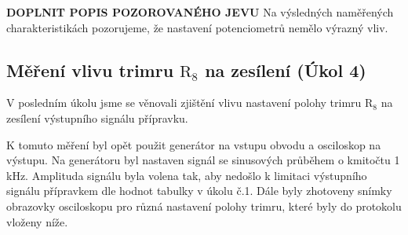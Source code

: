 \documentclass[a4paper, czech]{article}
\begin{document}
\textbf{DOPLNIT POPIS POZOROVANÉHO JEVU}
Na výsledných naměřených charakteristikách pozorujeme, že nastavení potenciometrů nemělo výrazný vliv.

\subsection{Měření vlivu trimru $\text{R}_8$ na zesílení (Úkol 4)}

V posledním úkolu jsme se věnovali zjištění vlivu nastavení polohy trimru $\text{R}_8$ na zesílení
výstupního signálu přípravku.

K tomuto měření byl opět použit generátor na vstupu obvodu a osciloskop na výstupu.
Na generátoru byl nastaven signál se sinusových průběhem o kmitočtu 1\,kHz.
Amplituda signálu byla volena tak, aby nedošlo k limitaci výstupního signálu přípravkem
dle hodnot tabulky v úkolu č.1.
Dále byly zhotoveny snímky obrazovky osciloskopu pro různá nastavení polohy trimru,
které byly do protokolu vloženy níže.
\end{document}
